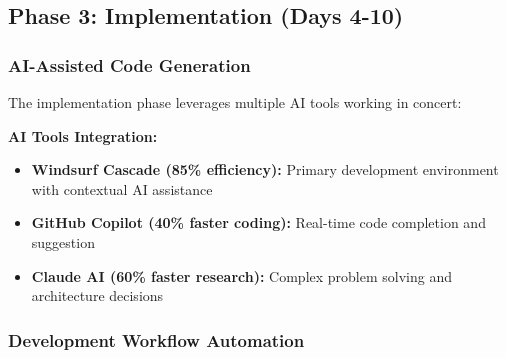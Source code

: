 \documentclass[11pt,a4paper]{article}
\begin{document}
\subsection{Phase 3: Implementation (Days 4-10)}

\subsubsection{AI-Assisted Code Generation}

The implementation phase leverages multiple AI tools working in concert:

\begin{tcolorbox}[colback=solanaGreen!10,colframe=solanaGreen]
\textbf{AI Tools Integration:}
\begin{itemize}
    \item \textbf{Windsurf Cascade (85\% efficiency):} Primary development environment with contextual AI assistance
    \item \textbf{GitHub Copilot (40\% faster coding):} Real-time code completion and suggestion
    \item \textbf{Claude AI (60\% faster research):} Complex problem solving and architecture decisions
\end{itemize}
\end{tcolorbox}

\subsubsection{Development Workflow Automation}
\end{document}
